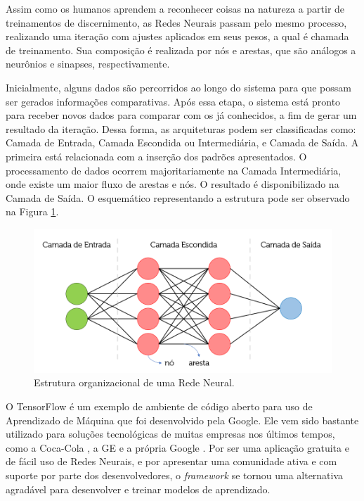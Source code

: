 Assim como os humanos aprendem a reconhecer coisas na natureza a partir de treinamentos de discernimento, as Redes Neurais passam pelo mesmo processo, realizando uma iteração com ajustes aplicados em seus pesos, a qual é chamada de treinamento. Sua composição é realizada por nós e arestas, que são análogos a neurônios e sinapses, respectivamente.

Inicialmente, alguns dados são percorridos ao longo do sistema para que possam ser gerados informações comparativas. Após essa etapa, o sistema está pronto para receber novos dados para comparar com os já conhecidos, a fim de gerar um resultado da iteração. Dessa forma, as arquiteturas podem ser classificadas como: Camada de Entrada, Camada Escondida ou Intermediária, e Camada de Saída. A primeira está relacionada com a inserção dos padrões apresentados. O processamento de dados ocorrem majoritariamente na Camada Intermediária, onde existe um maior fluxo de arestas e nós. O resultado é disponibilizado na Camada de Saída. O esquemático representando a estrutura pode ser observado na Figura \ref{fig:RedeNeural}.

\begin{figure}[h!]
    \centering
    \includegraphics[width=.75\columnwidth]{Imagens/RedeNeural.PNG}
    \caption{Estrutura organizacional de uma Rede Neural.}
    \label{fig:RedeNeural}
\end{figure}

O TensorFlow é um exemplo de ambiente de código aberto para uso de Aprendizado de Máquina que foi desenvolvido pela Google. Ele vem sido bastante utilizado para soluções tecnológicas de muitas empresas nos últimos tempos, como a Coca-Cola \cite{brandt_how_2017}, a GE \cite{polzin_intelligent_2019} e a própria Google \cite{bendersky_google_2021}. Por ser uma aplicação gratuita e de fácil uso de Redes Neurais, e por apresentar uma comunidade ativa e com suporte por parte dos desenvolvedores, o \textit{framework} se tornou uma alternativa agradável para desenvolver e treinar modelos de aprendizado.

